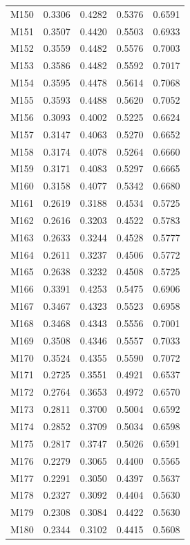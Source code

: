 \begin{longtable}{lrrrr}
M150 & 0.3306 & 0.4282 & 0.5376 & 0.6591 \\
M151 & 0.3507 & 0.4420 & 0.5503 & 0.6933 \\
M152 & 0.3559 & 0.4482 & 0.5576 & 0.7003 \\
M153 & 0.3586 & 0.4482 & 0.5592 & 0.7017 \\
M154 & 0.3595 & 0.4478 & 0.5614 & 0.7068 \\
M155 & 0.3593 & 0.4488 & 0.5620 & 0.7052 \\
M156 & 0.3093 & 0.4002 & 0.5225 & 0.6624 \\
M157 & 0.3147 & 0.4063 & 0.5270 & 0.6652 \\
M158 & 0.3174 & 0.4078 & 0.5264 & 0.6660 \\
M159 & 0.3171 & 0.4083 & 0.5297 & 0.6665 \\
M160 & 0.3158 & 0.4077 & 0.5342 & 0.6680 \\
M161 & 0.2619 & 0.3188 & 0.4534 & 0.5725 \\
M162 & 0.2616 & 0.3203 & 0.4522 & 0.5783 \\
M163 & 0.2633 & 0.3244 & 0.4528 & 0.5777 \\
M164 & 0.2611 & 0.3237 & 0.4506 & 0.5772 \\
M165 & 0.2638 & 0.3232 & 0.4508 & 0.5725 \\
M166 & 0.3391 & 0.4253 & 0.5475 & 0.6906 \\
M167 & 0.3467 & 0.4323 & 0.5523 & 0.6958 \\
M168 & 0.3468 & 0.4343 & 0.5556 & 0.7001 \\
M169 & 0.3508 & 0.4346 & 0.5557 & 0.7033 \\
M170 & 0.3524 & 0.4355 & 0.5590 & 0.7072 \\
M171 & 0.2725 & 0.3551 & 0.4921 & 0.6537 \\
M172 & 0.2764 & 0.3653 & 0.4972 & 0.6570 \\
M173 & 0.2811 & 0.3700 & 0.5004 & 0.6592 \\
M174 & 0.2852 & 0.3709 & 0.5034 & 0.6598 \\
M175 & 0.2817 & 0.3747 & 0.5026 & 0.6591 \\
M176 & 0.2279 & 0.3065 & 0.4400 & 0.5565 \\
M177 & 0.2291 & 0.3050 & 0.4397 & 0.5637 \\
M178 & 0.2327 & 0.3092 & 0.4404 & 0.5630 \\
M179 & 0.2308 & 0.3084 & 0.4422 & 0.5630 \\
M180 & 0.2344 & 0.3102 & 0.4415 & 0.5608 \\

\end{longtable}
